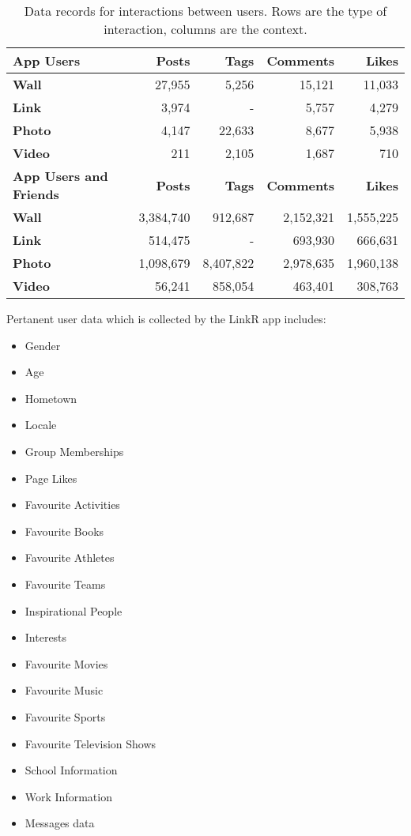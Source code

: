 \begin{table}[!htbp]
\centering
	\begin{tabular}{|l|r|r|r|r|} %
		\hline
		\textbf{App Users} & \textbf{Posts} & \textbf{Tags} & \textbf{Comments} & \textbf{Likes}  \\ \hline
		\textbf{Wall} & 27,955 & 5,256 & 15,121 & 11,033 \\ \hline
		\textbf{Link} & 3,974 & - & 5,757 & 4,279 \\ \hline
		\textbf{Photo} & 4,147 & 22,633 & 8,677 & 5,938 \\ \hline
		\textbf{Video} & 211 & 2,105 & 1,687 & 710 \\ \hline
		 \hline
		\textbf{App Users and Friends} & \textbf{Posts} & \textbf{Tags} & \textbf{Comments} & \textbf{Likes}  \\ \hline
		\textbf{Wall} & 3,384,740 & 912,687 & 2,152,321 & 1,555,225 \\ \hline
		\textbf{Link} & 514,475 & - & 693,930 & 666,631 \\ \hline
		\textbf{Photo} & 1,098,679 & 8,407,822 & 2,978,635 & 1,960,138 \\ \hline
		\textbf{Video} & 56,241 & 858,054 & 463,401 & 308,763 \\ \hline
	\end{tabular}
	\caption{Data records for interactions between users. Rows are the type of interaction, columns are the context.}
	\label{tab:revpol}
\end{table}

Pertanent user data which is collected by the LinkR app includes:
\begin{itemize}
\item Gender
\item Age
\item Hometown
\item Locale
\item Group Memberships
\item Page Likes
\item Favourite Activities
\item Favourite Books
\item Favourite Athletes
\item Favourite Teams
\item Inspirational People
\item Interests
\item Favourite Movies
\item Favourite Music
\item Favourite Sports
\item Favourite Television Shows
\item School Information
\item Work Information
\item Messages data
\end{itemize}

